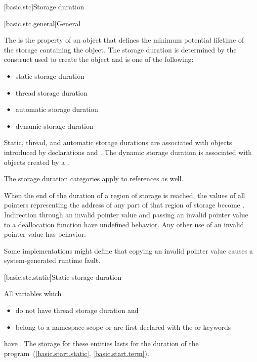 [basic.stc]{Storage duration}

[basic.stc.general]{General}

\pnum
{}%
The  is the property of an object that defines the minimum
potential lifetime of the storage containing the object. The storage
duration is determined by the construct used to create the object and is
one of the following:
\begin{itemize}
\item static storage duration
\item thread storage duration
\item automatic storage duration
\item dynamic storage duration
\end{itemize}

\pnum
{}%
%
%
%
Static, thread, and automatic storage durations are associated with objects
introduced by declarations and . The dynamic storage duration
is associated with objects created by a
.

\pnum
The storage duration categories apply to references as well.

\pnum
When the end of the duration of a region of storage is reached,
the values of all pointers
representing the address of any part of that region of storage
become .
Indirection through an invalid pointer value and
passing an invalid pointer value to a deallocation function
have undefined behavior.
Any other use of an invalid pointer value has
behavior.
\begin{footnote}
Some implementations might define that
copying an invalid pointer value
causes a system-generated runtime fault.
\end{footnote}

[basic.stc.static]{Static storage duration}

\pnum
All variables which
\begin{itemize}
\item
do not have thread storage duration and
\item
belong to a namespace scope or
are first declared with
the  or  keywords
\end{itemize}
have .
The storage for these entities lasts for the duration of the
program~(\ref{basic.start.static}, \ref{basic.start.term}).

